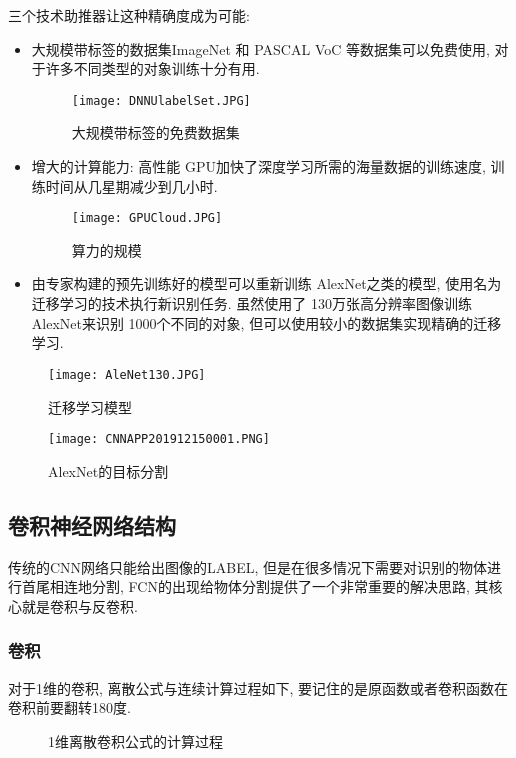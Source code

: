 三个技术助推器让这种精确度成为可能:
\begin{itemize}
\item 大规模带标签的数据集ImageNet 和 PASCAL VoC 等数据集可以免费使用, 对于许多不同类型的对象训练十分有用.
\begin{figure}[H]
    \centering
    \texttt{[image: DNNUlabelSet.JPG]}
    \caption{大规模带标签的免费数据集}
    \label{DNNUlabelSet201912250001}
    \vspace{-0.4cm}
\end{figure}
\item 增大的计算能力: 高性能 GPU加快了深度学习所需的海量数据的训练速度, 训练时间从几星期减少到几小时.
\begin{figure}[H]
    \centering
    \texttt{[image: GPUCloud.JPG]}
    \caption{算力的规模}
    \label{GPUCloud201912250002}
\end{figure}
\item 由专家构建的预先训练好的模型可以重新训练 AlexNet之类的模型, 使用名为迁移学习的技术执行新识别任务.
虽然使用了 130万张高分辨率图像训练 AlexNet来识别 1000个不同的对象, 但可以使用较小的数据集实现精确的迁移学习.
\end{itemize}
\begin{figure}[H]
    \centering
    \texttt{[image: AleNet130.JPG]}
    \caption{迁移学习模型}
    \label{AleNet130201912250003}
\end{figure}
\begin{figure}[H]
    \centering
    \texttt{[image: CNNAPP201912150001.PNG]}
    \caption{ AlexNet的目标分割}
    \label{CNNAPP201912150001}
\end{figure}
\subsection{卷积神经网络结构}
传统的CNN网络只能给出图像的LABEL, 但是在很多情况下需要对识别的物体进行首尾相连地分割, FCN的出现给物体分割提供了一个非常重要的解决思路, 其核心就是卷积与反卷积.
\subsubsection{卷积}
对于1维的卷积, 离散公式与连续计算过程如下, 要记住的是原函数或者卷积函数在卷积前要翻转180度.
\begin{figure}[H]
\centering
{}
\caption{1维离散卷积公式的计算过程}
\label{ConvolutionOP0203}
\end{figure}

